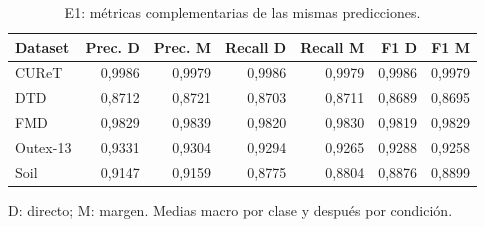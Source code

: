 \begin{table}[!htbp]\centering
\fontsize{8}{10}\selectfont\setlength{\tabcolsep}{4pt}
\caption{E1: métricas complementarias de las mismas predicciones.}\label{tab:e1-secondary}
\begin{tabular}{@{}lrrrrrr@{}}\toprule
Dataset & Prec. D & Prec. M & Recall D & Recall M & F1 D & F1 M\\\midrule
CUReT & 0,9986 & 0,9979 & 0,9986 & 0,9979 & 0,9986 & 0,9979\\
DTD & 0,8712 & 0,8721 & 0,8703 & 0,8711 & 0,8689 & 0,8695\\
FMD & 0,9829 & 0,9839 & 0,9820 & 0,9830 & 0,9819 & 0,9829\\
Outex-13 & 0,9331 & 0,9304 & 0,9294 & 0,9265 & 0,9288 & 0,9258\\
Soil & 0,9147 & 0,9159 & 0,8775 & 0,8804 & 0,8876 & 0,8899\\
\bottomrule\end{tabular}
\par\smallskip\begin{minipage}{0.98\textwidth}\footnotesize D: directo; M: margen. Medias macro por clase y después por condición.\end{minipage}
\end{table}
